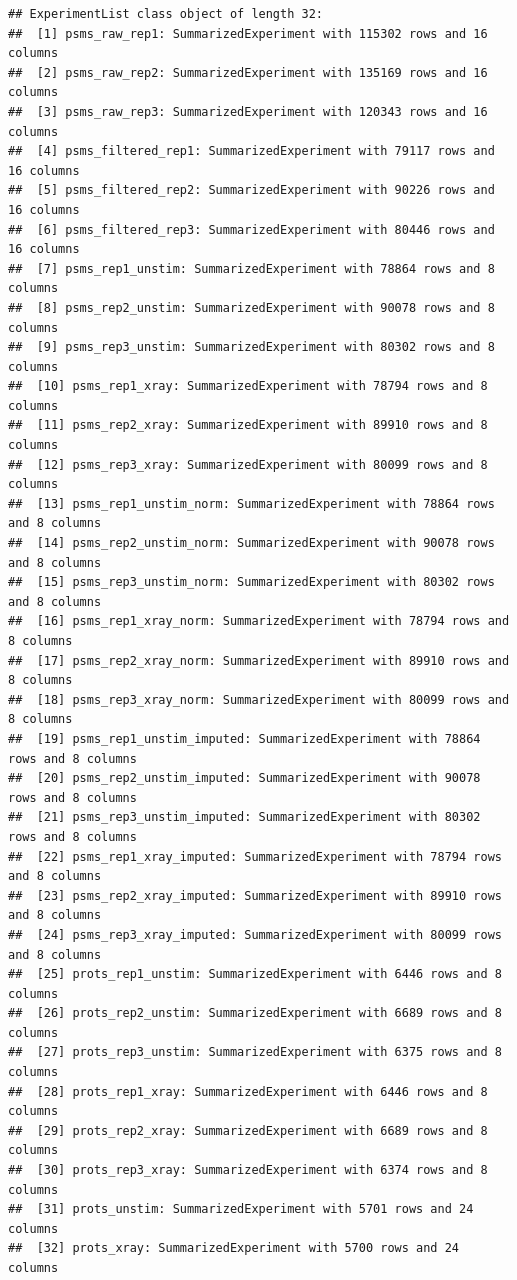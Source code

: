 \documentclass[9pt,a4paper,]{extarticle}
\begin{document}
\begin{verbatim}
## ExperimentList class object of length 32:
##  [1] psms_raw_rep1: SummarizedExperiment with 115302 rows and 16 columns
##  [2] psms_raw_rep2: SummarizedExperiment with 135169 rows and 16 columns
##  [3] psms_raw_rep3: SummarizedExperiment with 120343 rows and 16 columns
##  [4] psms_filtered_rep1: SummarizedExperiment with 79117 rows and 16 columns
##  [5] psms_filtered_rep2: SummarizedExperiment with 90226 rows and 16 columns
##  [6] psms_filtered_rep3: SummarizedExperiment with 80446 rows and 16 columns
##  [7] psms_rep1_unstim: SummarizedExperiment with 78864 rows and 8 columns
##  [8] psms_rep2_unstim: SummarizedExperiment with 90078 rows and 8 columns
##  [9] psms_rep3_unstim: SummarizedExperiment with 80302 rows and 8 columns
##  [10] psms_rep1_xray: SummarizedExperiment with 78794 rows and 8 columns
##  [11] psms_rep2_xray: SummarizedExperiment with 89910 rows and 8 columns
##  [12] psms_rep3_xray: SummarizedExperiment with 80099 rows and 8 columns
##  [13] psms_rep1_unstim_norm: SummarizedExperiment with 78864 rows and 8 columns
##  [14] psms_rep2_unstim_norm: SummarizedExperiment with 90078 rows and 8 columns
##  [15] psms_rep3_unstim_norm: SummarizedExperiment with 80302 rows and 8 columns
##  [16] psms_rep1_xray_norm: SummarizedExperiment with 78794 rows and 8 columns
##  [17] psms_rep2_xray_norm: SummarizedExperiment with 89910 rows and 8 columns
##  [18] psms_rep3_xray_norm: SummarizedExperiment with 80099 rows and 8 columns
##  [19] psms_rep1_unstim_imputed: SummarizedExperiment with 78864 rows and 8 columns
##  [20] psms_rep2_unstim_imputed: SummarizedExperiment with 90078 rows and 8 columns
##  [21] psms_rep3_unstim_imputed: SummarizedExperiment with 80302 rows and 8 columns
##  [22] psms_rep1_xray_imputed: SummarizedExperiment with 78794 rows and 8 columns
##  [23] psms_rep2_xray_imputed: SummarizedExperiment with 89910 rows and 8 columns
##  [24] psms_rep3_xray_imputed: SummarizedExperiment with 80099 rows and 8 columns
##  [25] prots_rep1_unstim: SummarizedExperiment with 6446 rows and 8 columns
##  [26] prots_rep2_unstim: SummarizedExperiment with 6689 rows and 8 columns
##  [27] prots_rep3_unstim: SummarizedExperiment with 6375 rows and 8 columns
##  [28] prots_rep1_xray: SummarizedExperiment with 6446 rows and 8 columns
##  [29] prots_rep2_xray: SummarizedExperiment with 6689 rows and 8 columns
##  [30] prots_rep3_xray: SummarizedExperiment with 6374 rows and 8 columns
##  [31] prots_unstim: SummarizedExperiment with 5701 rows and 24 columns
##  [32] prots_xray: SummarizedExperiment with 5700 rows and 24 columns
\end{verbatim}
\end{document}
